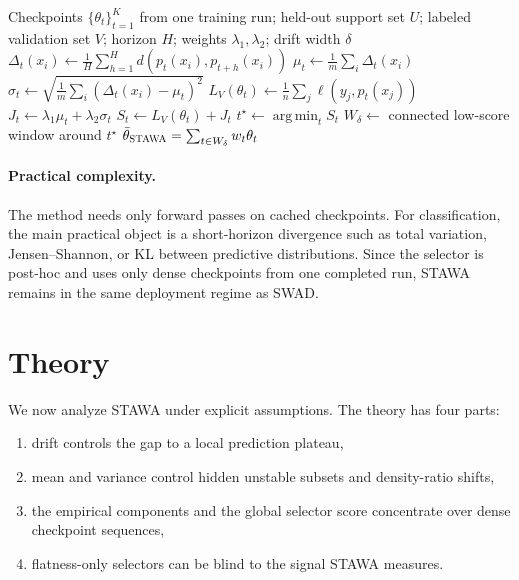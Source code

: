 \documentclass{article}
\newcommand{\argmin}{\operatorname*{arg\,min}}
\newcommand{\stawa}{\textup{\textsc{STAWA}}}
\newcommand{\swad}{\textup{\textsc{SWAD}}}
\begin{document}
\begin{algorithm}[t]
    \caption{\stawa{} (\textsc{Stationarity-Aware Weight Averaging})}
    \label{alg:stawa}
    \begin{algorithmic}[1]
        \Require Checkpoints $\{\theta_t\}_{t=1}^{K}$ from one training run; held-out support set $U$; labeled validation set $V$; horizon $H$; weights $\lambda_1,\lambda_2$; drift width $\delta$
                \State $\Delta_t(x_i) \gets \frac{1}{H}\sum_{h=1}^{H} d(p_t(x_i), p_{t+h}(x_i))$
            \EndFor
            \State $\mu_t \gets \frac{1}{m}\sum_i \Delta_t(x_i)$
            \State $\sigma_t \gets \sqrt{\frac{1}{m}\sum_i (\Delta_t(x_i)-\mu_t)^2}$
            \State $L_V(\theta_t) \gets \frac{1}{n}\sum_j \ell(y_j, p_t(x_j))$
            \State $J_t \gets \lambda_1 \mu_t + \lambda_2 \sigma_t$
        \EndFor
        \State $S_t \gets L_V(\theta_t) + J_t$
        \State $t^\star \gets \argmin_t S_t$
        \State $W_{\delta} \gets$ connected low-score window around $t^\star$
        \State \Return $\bar \theta_{\stawa} = \sum_{t\in W_{\delta}} w_t \theta_t$
    \end{algorithmic}
\end{algorithm}

\paragraph{Practical complexity.}
The method needs only forward passes on cached checkpoints. For classification, the main practical object is a short-horizon divergence such as total variation, Jensen--Shannon, or KL between predictive distributions. Since the selector is post-hoc and uses only dense checkpoints from one completed run, \stawa{} remains in the same deployment regime as \swad{}.

\section{Theory}
\label{sec:theory}

We now analyze \stawa{} under explicit assumptions. The theory has four parts:
\begin{enumerate}[leftmargin=1.4em]
    \item drift controls the gap to a local prediction plateau,
    \item mean and variance control hidden unstable subsets and density-ratio shifts,
    \item the empirical components and the global selector score concentrate over dense checkpoint sequences,
    \item flatness-only selectors can be blind to the signal \stawa{} measures.
\end{enumerate}
\end{document}
